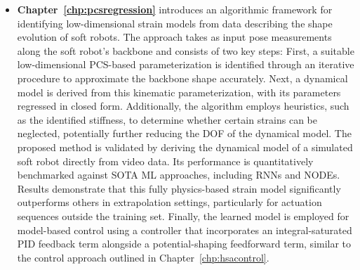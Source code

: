 \begin{itemize}
    \item \textbf{Chapter~\ref{chp:pcsregression}} introduces an algorithmic framework for identifying low-dimensional strain models from data describing the shape evolution of soft robots. The approach takes as input pose measurements along the soft robot’s backbone and consists of two key steps: First, a suitable low-dimensional \gls{PCS}-based parameterization is identified through an iterative procedure to approximate the backbone shape accurately. Next, a dynamical model is derived from this kinematic parameterization, with its parameters regressed in closed form. Additionally, the algorithm employs heuristics, such as the identified stiffness, to determine whether certain strains can be neglected, potentially further reducing the \gls{DOF} of the dynamical model. The proposed method is validated by deriving the dynamical model of a simulated soft robot directly from video data. Its performance is quantitatively benchmarked against \gls{SOTA} \gls{ML} approaches, including \glspl{RNN} and \glspl{NODE}. Results demonstrate that this fully physics-based strain model significantly outperforms others in extrapolation settings, particularly for actuation sequences outside the training set. Finally, the learned model is employed for model-based control using a controller that incorporates an integral-saturated PID feedback term alongside a potential-shaping feedforward term, similar to the control approach outlined in Chapter~\ref{chp:hsacontrol}.

\end{itemize}
